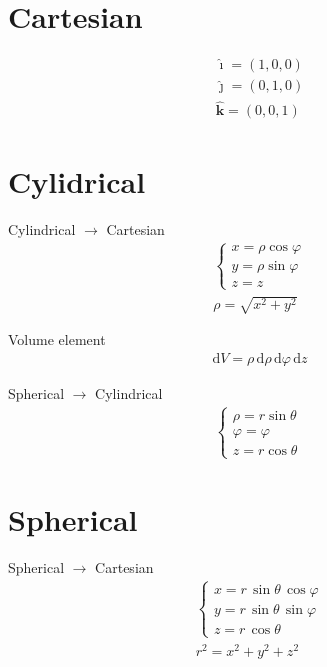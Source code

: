 \documentclass[12pt,a4paper]{article}
\begin{document}
\begin{multicols*}{2}
\flushleft
\section*{Cartesian}
\begin{align*}
\boldsymbol{\hat{\imath}} = (1, 0, 0)
\\
\boldsymbol{\hat{\jmath}} = (0, 1, 0)
\\
\boldsymbol{\hat{k}} = (0, 0, 1)
\end{align*}




\section*{Cylidrical}
Cylindrical $\to$ Cartesian
\begin{align*}
\begin{cases}
x = \rho \cos \varphi \\
y = \rho \sin \varphi \\
z = z
\end{cases} \\
\rho = \sqrt{x^{2}+y^{2}}
\end{align*}

Volume element
\begin{align*}
\mathrm{d}V = \rho\,\mathrm{d}\rho\,\mathrm{d}\varphi\,\mathrm{d}z
\end{align*}

Spherical $\to$ Cylindrical
\begin{align*}
\begin{cases}
\rho = r \sin \theta\, \\
\varphi = \varphi\, \\
z = r \cos \theta\, 
\end{cases}
\end{align*}



\section*{Spherical}
Spherical $\to$ Cartesian
\begin{align*}
\begin{cases}
x=r \, \sin\theta \, \cos\varphi \\
y=r \, \sin\theta \, \sin\varphi \\
z=r \, \cos\theta
\end{cases} \\
r^2 = x^2+y^2+z^2
\end{align*}


\end{multicols*}
\end{document}
